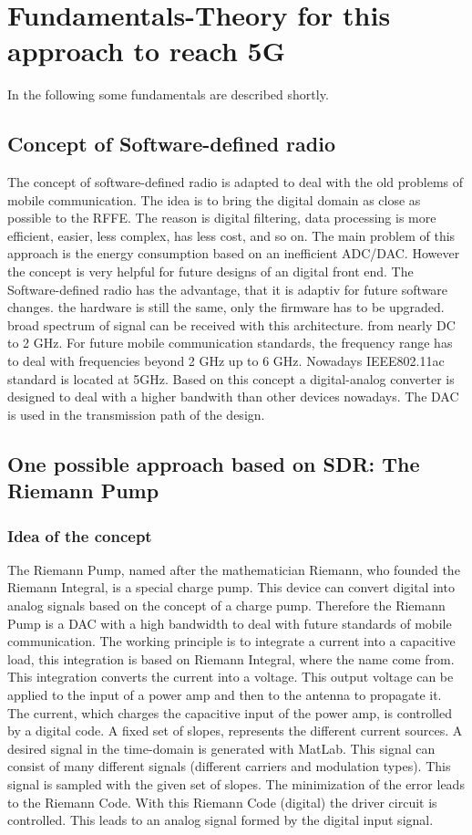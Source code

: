 \chapter{Fundamentals-Theory for this approach to reach 5G}
In the following some fundamentals are described shortly.
\section{Concept of Software-defined radio}
The concept of software-defined radio is adapted to deal with the old problems of mobile communication. The idea is to bring the digital domain as close as possible to the RFFE. The reason is digital filtering, data processing is more efficient, easier, less complex, has less cost, and so on. The main problem of this approach is the energy consumption based on an inefficient ADC/DAC. However the concept is very helpful for future designs of an digital front end. The Software-defined radio has the advantage, that it is adaptiv for future software changes. the hardware is still the same, only the firmware has to be upgraded. broad spectrum of signal can be received with this architecture. from nearly DC to 2 GHz. For future mobile communication standards, the frequency range has to deal with frequencies beyond 2 GHz up to 6 GHz. Nowadays IEEE802.11ac standard is located at 5GHz. Based on this concept a digital-analog converter is designed to deal with a higher bandwith than other devices nowadays. The DAC is used in the transmission path of the design.
\section{One possible approach based on SDR: The Riemann Pump}
\subsection{Idea of the concept}
The Riemann Pump, named after the mathematician Riemann, who founded the Riemann Integral, is a special charge pump. This device can convert digital into analog signals based on the concept of a charge pump. Therefore the Riemann Pump is a DAC with a high bandwidth to deal with future standards of mobile communication. The working principle is to
integrate a current into a capacitive load, this integration is based on Riemann Integral, where the name come from. This integration converts the current into a voltage. This output voltage can be applied to the input of a power amp and then to the antenna to propagate it. The current, which charges the capacitive input of the power amp, is controlled by a digital code. A fixed set of slopes, represents the different current sources. A desired signal in the time-domain is generated with MatLab. This signal can consist of many different signals (different carriers and modulation types). This signal is sampled with the given set of slopes. The minimization of the error leads to the Riemann Code. With this Riemann Code (digital) the driver circuit is controlled. This leads to an analog signal formed by the digital input signal. 
